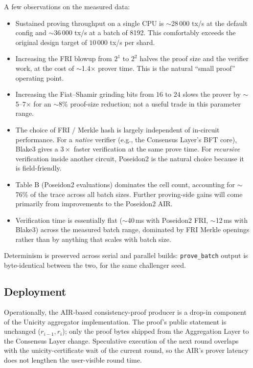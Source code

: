 \documentclass[twocolumn]{article}
\begin{document}
A few observations on the measured data:

\begin{itemize}[nosep]
    \item Sustained proving throughput on a single CPU is $\sim$28\,000 tx/s at the default config and $\sim$36\,000 tx/s at a batch of 8192. This comfortably exceeds the original design target of $10\,000$ tx/s per shard.
    \item Increasing the FRI blowup from $2^1$ to $2^2$ halves the proof size and the verifier work, at the cost of $\sim$1.4$\times$ prover time. This is the natural ``small proof'' operating point.
    \item Increasing the Fiat--Shamir grinding bits from $16$ to $24$ slows the prover by $\sim$5--7$\times$ for an $\sim$8\% proof-size reduction; not a useful trade in this parameter range.
    \item The choice of FRI / Merkle hash is largely independent of in-circuit performance. For a \emph{native} verifier (e.g., the Consensus Layer's BFT core), Blake3 gives a $3\times$ faster verification at the same prove time. For \emph{recursive} verification inside another circuit, Poseidon2 is the natural choice because it is field-friendly.
    \item Table B (Poseidon2 evaluations) dominates the cell count, accounting for $\sim$76\% of the trace across all batch sizes. Further proving-side gains will come primarily from improvements to the Poseidon2 AIR.
    \item Verification time is essentially flat ($\sim$40\,ms with Poseidon2 FRI, $\sim$12\,ms with Blake3) across the measured batch range, dominated by FRI Merkle openings rather than by anything that scales with batch size.
\end{itemize}

Determinism is preserved across serial and parallel builds: \texttt{prove\_batch} output is byte-identical between the two, for the same challenger seed.

\subsection{Deployment}

Operationally, the AIR-based consistency-proof producer is a drop-in component of the Unicity aggregator implementation. The proof's public statement is unchanged ($r_{i-1}, r_i$); only the proof bytes shipped from the Aggregation Layer to the Consensus Layer change. Speculative execution of the next round overlaps with the unicity-certificate wait of the current round, so the AIR's prover latency does not lengthen the user-visible round time.
\end{document}
